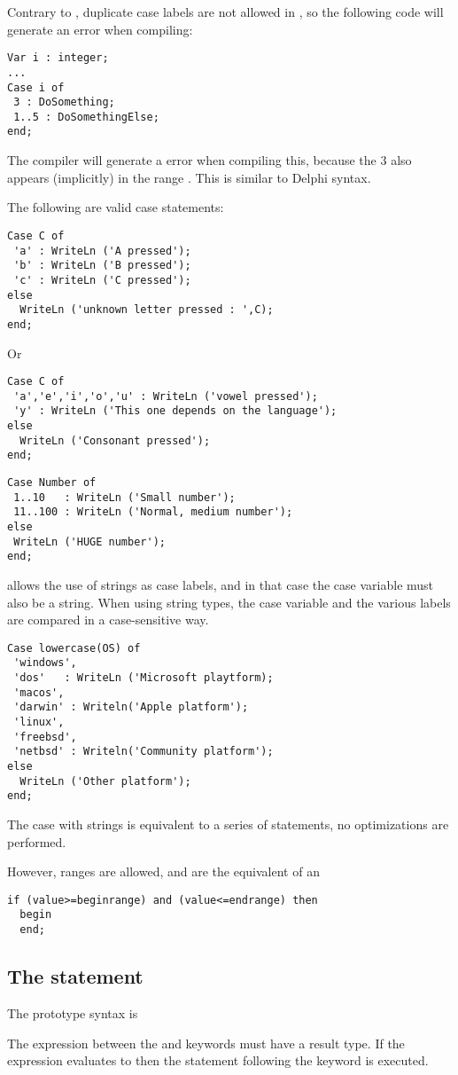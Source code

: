 \begin{remark}
Contrary to \tp, duplicate case labels are not
allowed in \fpc, so the following code will generate an error when
compiling:
\begin{verbatim}
Var i : integer;
...
Case i of
 3 : DoSomething;
 1..5 : DoSomethingElse;
end;
\end{verbatim}
The compiler will generate a  error when compiling
this, because the 3 also appears (implicitly) in the range . This
is similar to Delphi syntax.
\end{remark}
The following are valid case statements:
\begin{verbatim}
Case C of
 'a' : WriteLn ('A pressed');
 'b' : WriteLn ('B pressed');
 'c' : WriteLn ('C pressed');
else
  WriteLn ('unknown letter pressed : ',C);
end;
\end{verbatim}
Or
\begin{verbatim}
Case C of
 'a','e','i','o','u' : WriteLn ('vowel pressed');
 'y' : WriteLn ('This one depends on the language');
else
  WriteLn ('Consonant pressed');
end;
\end{verbatim}
\begin{verbatim}
Case Number of
 1..10   : WriteLn ('Small number');
 11..100 : WriteLn ('Normal, medium number');
else
 WriteLn ('HUGE number');
end;
\end{verbatim}
\fpc allows the use of strings as case labels, and in that case the case
variable must also be a string. When using string types, the case variable 
and the various labels are compared in a case-sensitive way. 
\begin{verbatim}
Case lowercase(OS) of
 'windows',
 'dos'   : WriteLn ('Microsoft playtform);
 'macos',
 'darwin' : Writeln('Apple platform');
 'linux',
 'freebsd',
 'netbsd' : Writeln('Community platform');
else
  WriteLn ('Other platform');
end;
\end{verbatim}
The case with strings is equivalent to a series of 
statements, no optimizations are performed.

However, ranges are allowed, and are the equivalent of an 
\begin{verbatim}
if (value>=beginrange) and (value<=endrange) then
  begin
  end;
\end{verbatim}

\subsection{The  statement}
The  prototype syntax is

The expression between the  and  keywords must have a
 result type. If the expression evaluates to  then the
statement following the  keyword is executed.

